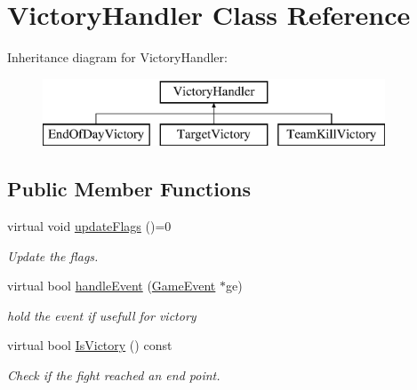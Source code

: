 \hypertarget{class_victory_handler}{}\section{Victory\+Handler Class Reference}
\label{class_victory_handler}
Inheritance diagram for Victory\+Handler\+:\begin{figure}[H]
\begin{center}
\leavevmode
\includegraphics[height=2.000000cm]{class_victory_handler}
\end{center}
\end{figure}
\subsection*{Public Member Functions}
\begin{DoxyCompactItemize}
\item 
virtual void \hyperlink{class_victory_handler_a0ed8ae4b1585207a23983f4c91d3139b}{update\+Flags} ()=0\hypertarget{class_victory_handler_a0ed8ae4b1585207a23983f4c91d3139b}{}\label{class_victory_handler_a0ed8ae4b1585207a23983f4c91d3139b}

\begin{DoxyCompactList}\small\item\em Update the flags. \end{DoxyCompactList}\item 
virtual bool \hyperlink{class_victory_handler_a29595ec35f431f90d0e970ccd80e9da9}{handle\+Event} (\hyperlink{class_game_event}{Game\+Event} $\ast$ge)
\begin{DoxyCompactList}\small\item\em hold the event if usefull for victory \end{DoxyCompactList}\item 
virtual bool \hyperlink{class_victory_handler_a659d49bc2a41afe67e66f96e90431a0f}{Is\+Victory} () const 
\begin{DoxyCompactList}\small\item\em Check if the fight reached an end point. \end{DoxyCompactList}\end{DoxyCompactItemize}
